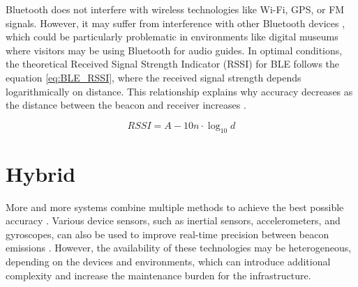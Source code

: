 Bluetooth does not interfere with wireless technologies like Wi-Fi, GPS, or FM signals. However, it may suffer from interference with other Bluetooth devices \cite{spachos_ble_2020}, which could be particularly problematic in environments like digital museums where visitors may be using Bluetooth for audio guides. In optimal conditions, the theoretical Received Signal Strength Indicator (RSSI) for BLE follows the equation \ref{eq:BLE_RSSI}, where the received signal strength depends logarithmically on distance. This relationship explains why accuracy decreases as the distance between the beacon and receiver increases \cite{spachos_ble_2020}. 

\begin{equation} \label{eq:BLE_RSSI}
    RSSI = A - 10n \cdot \log_{10}d
\end{equation}

\section{Hybrid}

More and more systems combine multiple methods to achieve the best possible accuracy \cite{shang_overview_2022}. Various device sensors, such as inertial sensors, accelerometers, and gyroscopes, can also be used to improve real-time precision between beacon emissions \cite{ali_locali_2017}. However, the availability of these technologies may be heterogeneous, depending on the devices and environments, which can introduce additional complexity and increase the maintenance burden for the infrastructure.